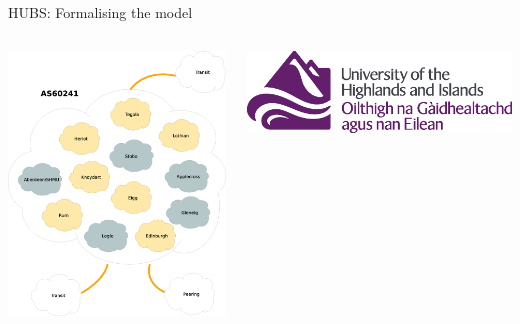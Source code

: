 \documentclass{beamer}
\begin{document}
\begin{frame}{HUBS: Formalising the model}
  \begin{columns}
    \includegraphics[width=\textwidth]{confederation.eps}\\
    \vspace{-0.5\baselineskip}
    \begin{center}
      \includegraphics[height=0.07\textheight]{UHI_Logo_CMYK}
      \hspace{1pt}

\end{center}
\end{columns}
\end{frame}
\end{document}
